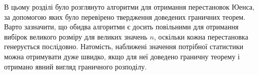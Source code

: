 В цьому розділі було розглянуто алгоритми
для отримання перестановок Юенса, за допомогою
яких було перевірено твердження доведених граничних теорем.
Варто зазначити, що обидва алгоритми є досить
повільними для отримання вибірок великого розміру
для великих значень $n$, оскільки кожна перестановка генерується
послідовно. Натомість, наближені значення потрібної
статистики можна отримувати дуже швидко, якщо для неї
доведено граничну теорему і отримано явний вигляд
граничного розподілу.